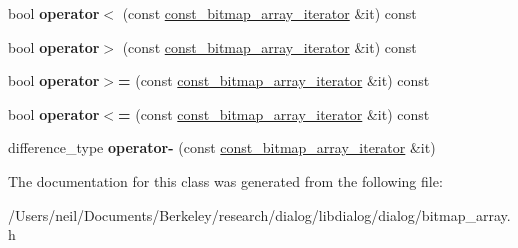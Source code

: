 \begin{DoxyCompactItemize}
bool {\bfseries operator$<$} (const \hyperlink{classdialog_1_1const__bitmap__array__iterator}{const\+\_\+bitmap\+\_\+array\+\_\+iterator} \&it) const
\item 
\mbox{\label{classdialog_1_1const__bitmap__array__iterator_a2fd2de645d4c729a16be22c4c14614d1}} 
bool {\bfseries operator$>$} (const \hyperlink{classdialog_1_1const__bitmap__array__iterator}{const\+\_\+bitmap\+\_\+array\+\_\+iterator} \&it) const
\item 
\mbox{\label{classdialog_1_1const__bitmap__array__iterator_a3e31bbc2c3f06e1fd7856440ad8ae693}} 
bool {\bfseries operator$>$=} (const \hyperlink{classdialog_1_1const__bitmap__array__iterator}{const\+\_\+bitmap\+\_\+array\+\_\+iterator} \&it) const
\item 
\mbox{\label{classdialog_1_1const__bitmap__array__iterator_a64755d66edcdc3d3fa35a2749c276200}} 
bool {\bfseries operator$<$=} (const \hyperlink{classdialog_1_1const__bitmap__array__iterator}{const\+\_\+bitmap\+\_\+array\+\_\+iterator} \&it) const
\item 
\mbox{\label{classdialog_1_1const__bitmap__array__iterator_a25f00aa8a3574b35138979901eb4121d}} 
difference\+\_\+type {\bfseries operator-\/} (const \hyperlink{classdialog_1_1const__bitmap__array__iterator}{const\+\_\+bitmap\+\_\+array\+\_\+iterator} \&it)
\end{DoxyCompactItemize}


The documentation for this class was generated from the following file\+:\begin{DoxyCompactItemize}
\item 
/\+Users/neil/\+Documents/\+Berkeley/research/dialog/libdialog/dialog/bitmap\+\_\+array.\+h\end{DoxyCompactItemize}
